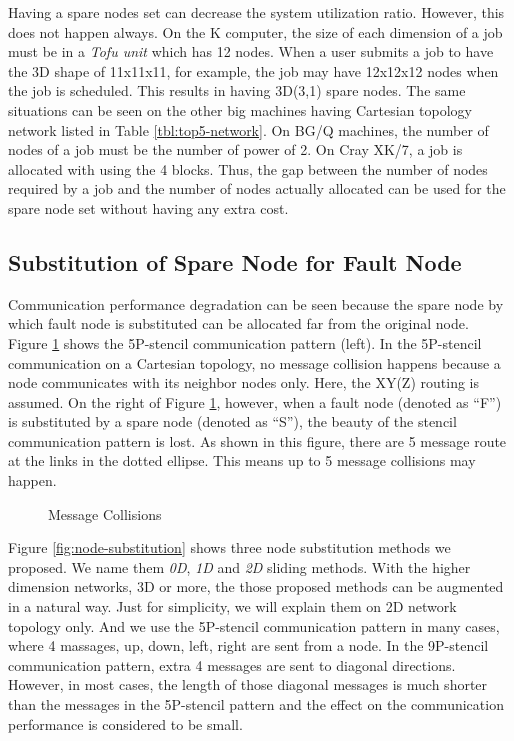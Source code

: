 \documentclass[10pt,conference,a4paper,fleqn]{IEEEtran}
\begin{document}
Having a spare nodes set can decrease the system utilization
ratio. However, this does not happen always. On the K computer, the
size of each dimension of a job must be in a {\it Tofu unit} which has
12 nodes. When a user
submits a job to have the 3D shape of 11x11x11, for
example, the job may have 12x12x12 nodes when the job is
scheduled. This results in having 3D(3,1) spare nodes. The same
situations can be seen on the other big 
machines having Cartesian topology network listed in Table
\ref{tbl:top5-network}. On BG/Q machines, the number of nodes of a job
must be the number of power of 2\cite{BGQ}. On Cray XK/7, a job is
allocated with using the 4  
blocks\cite{Pena:2013:ATM:2488551.2488564}. Thus, the gap between the
number of nodes required by a job and the number of nodes actually
allocated can be used for the spare node set without having any extra
cost. 

\subsection{Substitution of Spare Node for Fault Node}
\label{sec:substitution}

Communication performance degradation can be seen because the spare
node by which fault node is substituted can be allocated far from 
the original node. Figure \ref{fig:collisions} shows the 5P-stencil
communication pattern (left). In the 5P-stencil communication on a
Cartesian topology, no message collision happens because a node
communicates with its neighbor nodes only. Here, the XY(Z)
routing is assumed. On the right
of Figure \ref{fig:collisions}, however, when a fault node (denoted as
``F'') is substituted by a spare node (denoted as ``S''), the beauty
of the stencil communication pattern is lost. As shown in this 
figure, there are 5 message route at the links in the dotted
ellipse. This means up to 5 message collisions may happen.

\begin{figure}[ht]
\begin{center}
  \caption{Message Collisions} 
  \label{fig:collisions}
\end{center}
\end{figure}

Figure \ref{fig:node-substitution} shows three node substitution
methods we proposed. We name them {\it 0D}, {\it 1D} and {\it 2D}
sliding methods. With the higher dimension networks, 3D or more, the
those proposed methods can be augmented in a natural way. Just for
simplicity, we will explain them on 2D network topology only. And we use
the 5P-stencil communication pattern in many cases, where 4 massages, up,
down, left, right are sent from a node. In the 9P-stencil
communication pattern, extra 4 messages are sent to diagonal
directions. However, in most cases, the length of those diagonal
messages is much shorter than the messages in the 5P-stencil
pattern and the effect on the communication performance is considered
to be small.
\end{document}
